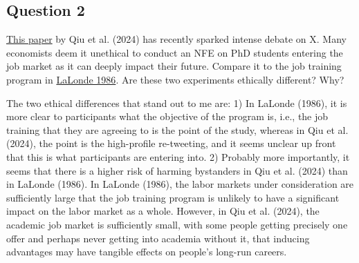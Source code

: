 \documentclass[10pt]{article}
\begin{document}

\subsection{Question 2}

\href{https://papers.ssrn.com/sol3/papers.cfm?abstract_id=4778120}{This paper} 
by Qiu et al. (2024) has recently sparked intense debate on X. Many 
economists deem it unethical to conduct an NFE on PhD students entering the 
job market as it can deeply impact their future. Compare it to the job 
training program in \href{https://www.jstor.org/stable/1806062}{LaLonde 1986}. 
Are these two experiments ethically different? Why? 

\hrulefill\hspace{0.5em}\dotfill\hspace{0.5em}\hrulefill

The two ethical differences that stand out to me are: 1) In 
LaLonde (1986), it is more clear to participants 
what the objective of the program is, i.e., the job training that 
they are agreeing to is the point of the study, whereas in 
Qiu et al. (2024), the point is the high-profile re-tweeting, and it 
seems unclear up front that this is what 
participants are entering into. 2) Probably more importantly, 
it seems that there is a higher risk of harming bystanders in 
Qiu et al. (2024) than in LaLonde (1986). In LaLonde (1986),
the labor markets under consideration are sufficiently large that 
the job training program is unlikely to have a
significant impact on the labor market as a whole.
However, in Qiu et al. (2024), the academic job market 
is sufficiently small, with some people getting precisely one offer
and perhaps never getting into academia without it, 
that inducing advantages
may have tangible effects on people's long-run careers.
\end{document}
